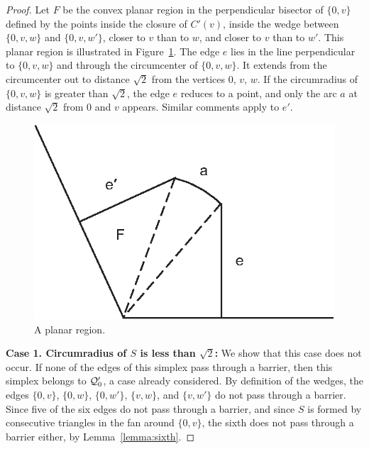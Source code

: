 \begin{proof}

Let $F$ be the convex planar region in the perpendicular bisector
of $\{0,v\}$ defined by the points inside
the
closure of $C'(v)$, inside the
wedge between $\{0,v,w\}$ and $\{0,v,w'\}$, closer to $v$ than to
$w$, and closer to $v$ than to $w'$. This planar region is
illustrated in Figure~\ref{fig:face}.   The edge $e$  lies in the
line perpendicular to $\{0,v,w\}$  and through the circumcenter of
$\{0,v,w\}$.  It extends from the circumcenter out to distance
$\sqrt2$ from the vertices $0$, $v$, $w$.  If the circumradius
of $\{0,v,w\}$ is
greater than $\sqrt2$, the edge $e$ reduces to a point, and only
the arc $a$ at distance $\sqrt2$ from $0$ and $v$ appears. Similar
comments apply to $e'$.

\begin{figure}[htb]
  \centering
  \includegraphics{PS/diag-face.eps}
  \caption{A planar region.}
  \label{fig:face}
\end{figure}

{\bf Case 1. Circumradius of $S$ is less than $\sqrt2$:}  We show
that this case does not occur.  If none of the edges of this
simplex pass through a barrier, then this simplex belongs to
${\mathcal Q}_0'$, a case already considered.  By definition of the
wedges, the edges $\{0,v\}$, $\{0,w\}$, $\{0,w'\}$, $\{v,w\}$, and
$\{v,w'\}$ do not pass through a barrier.  Since five of the six
edges do not pass through a barrier, and since $S$ is formed by
consecutive triangles in the fan around $\{0,v\}$, the sixth does
not pass through a barrier either, by Lemma~\ref{lemma:sixth}.



\end{proof}
